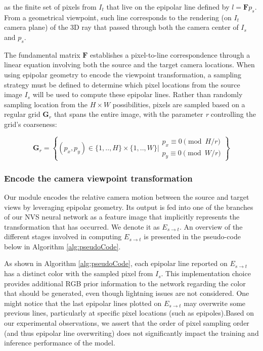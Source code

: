 as the finite set of pixels from $I_{t}$ that live on the epipolar line defined by $l=\mathbf{F}p_{s}$. From a geometrical viewpoint, such line corresponds to the rendering (on $I_{t}$ camera plane) of the 3D ray that passed through both the camera center of $I_{s}$ and $p_{s}$. 

The fundamental matrix $\mathbf{F}$ establishes a pixel-to-line correspondence through a linear equation involving both the source and the target camera locations. When using epipolar geometry to encode the viewpoint transformation, a sampling strategy must be defined to determine which pixel locations from the source image $I_{s}$ will be used to compute these epipolar lines. Rather than randomly sampling location from the $H\times W$ possibilities, pixels are sampled based on a regular grid $\textbf{G}_{r}$ that spans the entire image, with the parameter \textit{r} controlling the grid’s coarseness: 

\begin{equation}
    \mathbf{G}_{r} = \left\{(p_{x},p_{y}) \in \{1,..,H\}\times \{1,..,W\} \Big\rvert \begin{array}{l}
                    p_x \equiv 0 \pmod{H/r}\\
             p_y \equiv 0 \pmod{W/r}
              \end{array}\right\}
\end{equation}

\subsubsection{Encode the camera viewpoint transformation}

Our module encodes the relative camera motion between the source and target views by leveraging epipolar geometry. Its output is fed into one of the branches of our \ac{NVS} neural network as a feature image that implicitly represents the transformation that has occurred. We denote it as $E_{s\xrightarrow{}t}$.
An overview of the different stages involved in computing $E_{s\xrightarrow{}t}$ is presented in the pseudo-code below in Algorithm \ref{alg:pseudoCode}. \newline

As shown in Algorithm \ref{alg:pseudoCode}, each epipolar line reported on $E_{s\xrightarrow{}t}$ has a distinct color with the sampled pixel from $I_s$. This implementation choice provides additional RGB prior information to the network regarding the color that should be generated, even though lightning issues are not considered. One might notice that the last epipolar lines plotted on $E_{s\xrightarrow{}t}$ may overwrite some previous lines, particularly at specific pixel locations (such as epipoles).Based on our experimental observations, we assert that the order of pixel sampling order (and thus epipolar line overwriting) does not significantly impact the training and inference performance of the model. 

